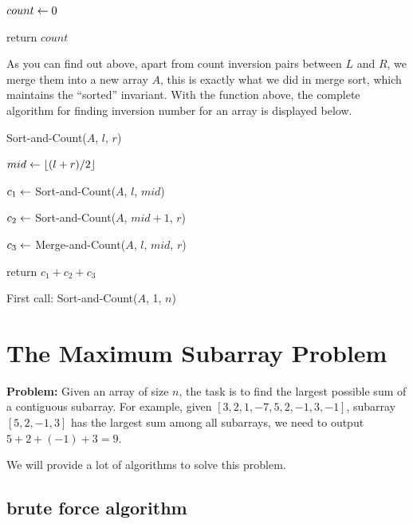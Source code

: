 \begin{spacing}{1.3}
\begin{algorithm}[H]
        $count \leftarrow 0$  \qquad {}

        return $count$

    \end{algorithm}

    As you can find out above, apart from count inversion pairs 
    between $L$ and $R$, we merge them into a new array $A$,
    this is exactly what we did in merge sort, which maintains
    the ``sorted'' invariant. With the function above, 
    the complete algorithm for finding inversion number for an array is 
    displayed below.

    \begin{algorithm}
        \caption{Sort-and-Count($A$, $l$, $r$)}

        $mid\leftarrow \lfloor (l+r)/2\rfloor$

        $c_1\leftarrow $ Sort-and-Count($A$, $l$, $mid$)

        $c_2\leftarrow $ Sort-and-Count($A$, $mid+1$, $r$)

        $c_3\leftarrow $ Merge-and-Count($A$, $l$, $mid$, $r$)

        return $c_1+c_2+c_3$
    \end{algorithm}

    First call: Sort-and-Count($A$, 1, $n$)

    \newpage
    \section{The Maximum Subarray Problem}

    {\bf Problem:} Given an array of size $n$, the task is
    to find the largest possible sum of a contiguous subarray.
    For example, given $[3,2,1,-7,5,2,-1,3,-1]$, 
    subarray $[5,2,-1,3]$ has the largest sum among all subarrays,
    we need to output $5+2+(-1)+3=9$.

    We will provide a lot of algorithms to solve this problem.

    \subsection{brute force algorithm}


\end{spacing}
